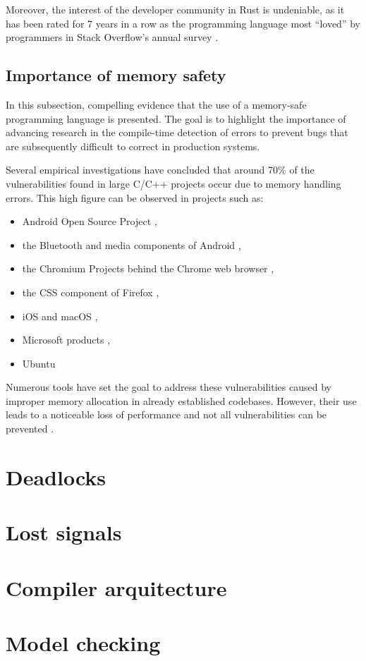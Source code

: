 Moreover, the interest of the developer community in Rust is undeniable,
as it has been rated for 7 years in a row as the programming language most ``loved'' by programmers
in Stack Overflow's annual survey \cite{so-survey2022}.

\subsection{Importance of memory safety}

In this subsection, compelling evidence that the use of a memory-safe programming language is presented.
The goal is to highlight the importance of advancing research in the compile-time detection of errors
to prevent bugs that are subsequently difficult to correct in production systems.

Several empirical investigations have concluded that around 70\% of the vulnerabilities
found in large C/C++ projects occur due to memory handling errors.
This high figure can be observed in projects such as:

\begin{itemize}
    \item Android Open Source Project \cite{memory-bugs-android},
    \item the Bluetooth and media components of Android \cite{memory-bugs-android-media-bluetooth},
    \item the Chromium Projects behind the Chrome web browser \cite{memory-bugs-chrome},
    \item the CSS component of Firefox \cite{memory-bugs-firefox},
    \item iOS and macOS \cite{memory-bugs-ios-macos},
    \item Microsoft products \cite{miller-security-microsoft2019, memory-bugs-microsoft},
    \item Ubuntu \cite{memory-bugs-ubuntu}
\end{itemize}

Numerous tools have set the goal to address these vulnerabilities
caused by improper memory allocation in already established codebases.
However, their use leads to a noticeable loss of performance and
not all vulnerabilities can be prevented \cite{szekeres2013sok}.

\section{Deadlocks}

\section{Lost signals}

\section{Compiler arquitecture}

\section{Model checking}

\bigskip